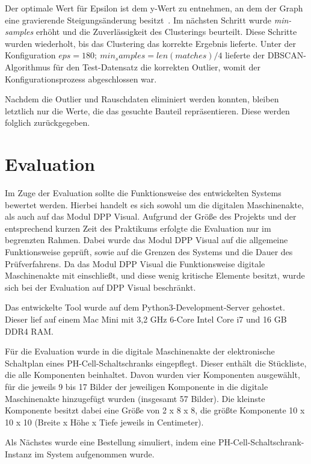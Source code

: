 \documentclass[
    type=Prakikumsbericht,
    status=draft, %
    language=german, %
    bibengine=bibtex,
]{unibwm-inf-thesis}
\begin{document}
    Der optimale Wert für Epsilon ist dem y-Wert zu entnehmen, an dem der Graph eine gravierende Steigungsänderung besitzt~\citep{Maklin2019}.
    Im nächsten Schritt wurde \textit{min-samples} erhöht und die Zuverlässigkeit des Clusterings beurteilt.
    Diese Schritte wurden wiederholt, bis das Clustering das korrekte Ergebnis lieferte.
    Unter der Konfiguration $eps = 180; ~ min_samples=len(matches) / 4$ lieferte der \ac{DBSCAN}-Algorithmus für den Test-Datensatz die korrekten Outlier, womit der Konfigurationsprozess abgeschlossen war.

    Nachdem die Outlier und Rauschdaten eliminiert werden konnten, bleiben letztlich nur die Werte, die das gesuchte Bauteil repräsentieren.
    Diese werden folglich zurückgegeben.


    \chapter{Evaluation}
    Im Zuge der Evaluation sollte die Funktionsweise des entwickelten Systems bewertet werden.
    Hierbei handelt es sich sowohl um die digitalen Maschinenakte, als auch auf das Modul \ac{DPP} Visual.
    Aufgrund der Größe des Projekts und der entsprechend kurzen Zeit des Praktikums erfolgte die Evaluation nur im begrenzten Rahmen.
    Dabei wurde das Modul \ac{DPP} Visual auf die allgemeine Funktionsweise geprüft, sowie auf die Grenzen des Systems und die Dauer des Prüfverfahrens.
    Da das Modul \ac{DPP} Visual die Funktionsweise digitale Maschinenakte mit einschließt, und diese wenig kritische Elemente besitzt, wurde sich bei der Evaluation auf \ac{DPP} Visual beschränkt.

    Das entwickelte Tool wurde auf dem Python3-Development-Server gehostet.
    Dieser lief auf einem Mac Mini mit 3,2 GHz 6-Core Intel Core i7 und 16 GB DDR4 RAM.

    Für die Evaluation wurde in die digitale Maschinenakte der elektronische Schaltplan eines PH-Cell-Schaltschranks eingepflegt.
    Dieser enthält die Stückliste, die alle Komponenten beinhaltet.
    Davon wurden vier Komponenten ausgewählt, für die jeweils 9 bis 17 Bilder der jeweiligen Komponente in die digitale Maschinenakte hinzugefügt wurden (insgesamt 57 Bilder).
    Die kleinste Komponente besitzt dabei eine Größe von 2 x 8 x 8, die größte Komponente 10 x 10 x 10 (Breite x Höhe x Tiefe jeweils in Centimeter).

    Als Nächstes wurde eine Bestellung simuliert, indem eine PH-Cell-Schaltschrank-Instanz im System aufgenommen wurde.
\end{document}
